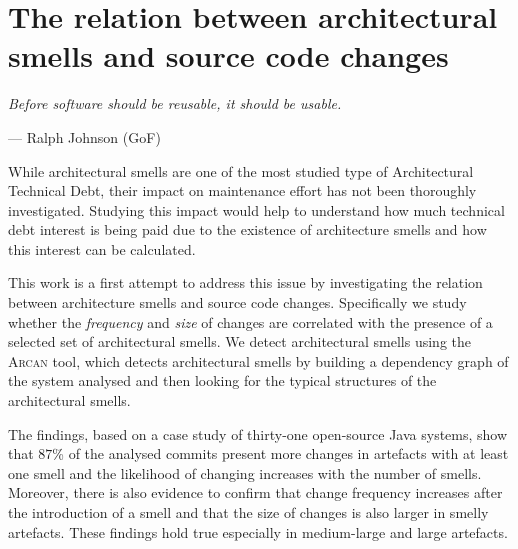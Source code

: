 \setlength{\headheight}{1.2cm}
\renewcommand{\publ}{\flushleft\footnotesize{Based on:\\[0.1cm]
		\textit{D. Sas, P. Avgeriou, I. Pigazzini, and F. Arcelli F. (2022). On the relation between architectural smells and source code changes. Journal of Software: Evolution and Process, 34(1), e2398.} \\[0.1cm]
}}

\chapter{The relation between architectural smells and source code changes}
\label{chap:5}
\epigraph{\emph{Before software should be reusable, it should be usable.}}{--- Ralph Johnson (GoF)}

\begin{Abstract}
	While architectural smells are one of the most studied type of Architectural Technical Debt, their impact on maintenance effort has not been thoroughly investigated.
	Studying this impact would help to understand how much technical debt interest is being paid due to the existence of architecture smells and how this interest can be calculated.
	
	This work is a first attempt to address this issue by investigating the relation between architecture smells and source code changes. Specifically we study whether the \emph{frequency} and \emph{size} of changes are correlated with the presence of a selected set of architectural smells.
	We detect architectural smells using the \textsc{Arcan} tool, which detects architectural smells by building a dependency graph of the system analysed and then looking for the typical structures of the architectural smells.
	
	The findings, based on a case study of thirty-one open-source Java systems, show that $87$\% of the analysed commits present more changes in artefacts with at least one smell and the likelihood of changing increases with the number of smells.
	Moreover, there is also evidence to confirm that change frequency increases after the introduction of a smell and that the size of changes is also larger in smelly artefacts.
	These findings hold true especially in medium-large and large artefacts.
\end{Abstract}

